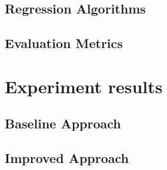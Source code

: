 \documentclass[11pt]{article} %
\begin{document}
\subsection{Regression Algorithms}

\subsection{Evaluation Metrics}



\section{Experiment results}
\subsection{Baseline Approach}

\subsection{Improved Approach}
\end{document}
